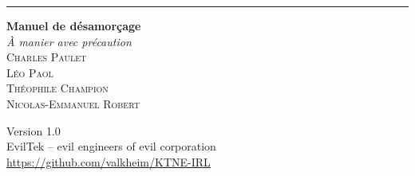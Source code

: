 \begin{titlepage} %
  \raggedleft %

  \rule{1pt}{\textheight} %
  \hspace{0.05\textwidth} %
  \parbox[b]{0.75\textwidth}{ %

    {\color{titlered}\Huge\bfseries Manuel de désamorçage}\\[2\baselineskip] %
    {\large\textit{À manier avec précaution}}\\[4\baselineskip] %
    {
      \textsc{Charles Paulet \\[0.5\baselineskip]
        Léo Paol \\[0.5\baselineskip]
        Théophile Champion \\[0.5\baselineskip]
        Nicolas-Emmanuel Robert
      }
    }

    \vspace{0.4\textheight} %

    {
      Version 1.0\\
      EvilTek -- evil engineers of evil corporation\\
      \noindent \url{https://github.com/valkheim/KTNE-IRL}
    }
  }
\end{titlepage}

